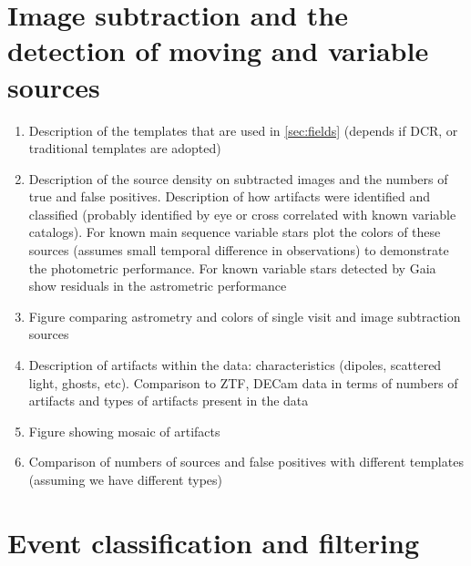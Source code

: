 \section{Image subtraction and the detection of moving and variable sources}

\begin{enumerate}

    \item Description of the templates that are used in \ref{sec:fields} (depends if DCR, or traditional templates are adopted)
    \item Description of the source density on subtracted images and the numbers of true and false positives. Description of how 
    artifacts were identified and classified (probably identified by eye or cross correlated with known variable catalogs). For known main sequence variable stars plot the colors of these sources (assumes small temporal difference in observations)
    to demonstrate the photometric performance. For known  variable stars detected by Gaia show residuals in the astrometric performance
    \item Figure comparing astrometry and colors of single visit and image subtraction sources 
    \item Description of artifacts within the data: characteristics (dipoles, scattered light, ghosts, etc). Comparison to ZTF, DECam data in terms
    of numbers of artifacts and types of artifacts present in the data
    \item Figure showing mosaic of artifacts
    \item Comparison of numbers of sources and false positives with different templates (assuming we have different types)

\end{enumerate}


\section{Event classification and filtering}

